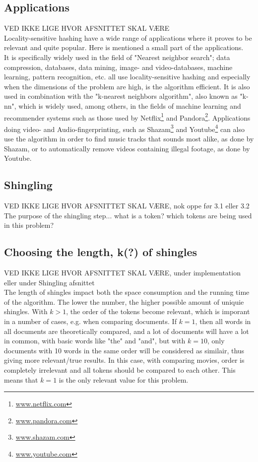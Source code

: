 \subsection{Applications}
VED IKKE LIGE HVOR AFSNITTET SKAL VÆRE\\
Locality-sensitive hashing have a wide range of applications where it proves to be relevant and quite popular. Here is mentioned a small part of the applications.  \\
It is specifically widely used in the field of "Nearest neighbor search"; data compression, databases, data mining, image- and video-databases, machine learning, pattern recognition, etc. all use locality-sensitive hashing and especially when the dimensions of the problem are high, is the algorithm efficient. 
It is also used in combination with the "k-nearest neighbors algorithm", also known as "k-nn", which is widely used, among others, in the fields of machine learning and recommender systems such as those used by Netflix\footnote{\url{www.netflix.com}} and Pandora\footnote{\url{www.pandora.com}}. Applications doing video- and Audio-fingerprinting, such as Shazam\footnote{\url{www.shazam.com}} and Youtube\footnote{\url{www.youtube.com}} can also use the algorithm in order to find music tracks that sounds most alike, as done by Shazam, or to automatically remove videos containing illegal footage, as done by Youtube.

\subsection{Shingling}
VED IKKE LIGE HVOR AFSNITTET SKAL VÆRE, nok oppe før 3.1 eller 3.2\\
The purpose of the shingling step... what is a token? which tokens are being used in this problem?

\subsection{Choosing the length, k(?) of shingles}
VED IKKE LIGE HVOR AFSNITTET SKAL VÆRE, under implementation eller under Shingling afsnittet\\
The length of shingles impact both the space consumption and the running time of the algorithm. The lower the number, the higher possible amount of uniquie shingles. With \(k > 1\), the order of the tokens become relevant, which is imporant in a number of cases, e.g. when comparing documents. If \(k = 1\), then all words in all documents are theoretically compared, and a lot of documents will have a lot in common, with basic words like "the" and "and", but with \(k = 10\), only documents with 10 words in the same order will be considered as similair, thus giving more relevant/true results. In this case, with comparing movies, order is completely irrelevant and all tokens should be compared to each other. This means that \(k=1\) is the only relevant value for this problem.